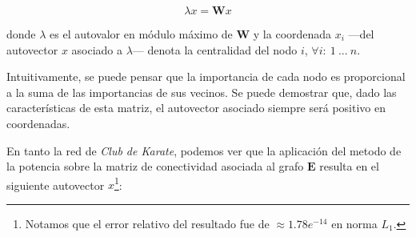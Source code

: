 \vspace{1em}
\begin{equation} \label{conectividad}
    \lambda x = \mathbf{W} x
\end{equation}

\vspace{1em}
\noindent donde $\lambda$ es el autovalor en módulo máximo de \textbf{W} y la coordenada $x_i$ ---del autovector $x$ asociado a $\lambda$--- denota la centralidad del nodo $i$, $\forall i:\ 1\ ...\ n$.

\vspace{1em}
Intuitivamente, se puede pensar que la importancia de cada nodo es proporcional a la suma de las importancias de sus vecinos. Se puede demostrar \cite{Newman} que, dado las características de esta matriz, el autovector asociado siempre será positivo en coordenadas.

\vspace{1em}
En tanto la red de \textit{Club de Karate}, podemos ver que la aplicación del metodo de la potencia sobre la matriz de conectividad asociada al grafo $\mathbf{E}$ resulta en el siguiente autovector $x$\footnote{Notamos que el error relativo del resultado fue de $\approx 1.78e^{-14}$ en norma $L_1$.}:

